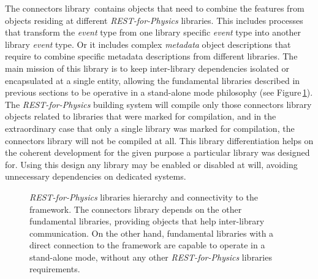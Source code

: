 The connectors library\,\cite{REST_Connectors_Git} contains objects that need to combine the features from objects residing at different \emph{REST-for-Physics} libraries. This includes processes that transform the \emph{event} type from one library specific \emph{event} type into another library \emph{event} type. Or it includes complex \emph{metadata} object descriptions that require to combine specific metadata descriptions from different libraries. The main mission of this library is to keep inter-library dependencies isolated or encapsulated at a single entity, allowing the fundamental libraries described in previous sections to be operative in a stand-alone mode philosophy (see Figure\,\ref{fig:connectorslib}). The \emph{REST-for-Physics} building system will compile only those connectors library objects related to libraries that were marked for compilation, and in the extraordinary case that only a single library was marked for compilation, the connectors library will not be compiled at all. This library differentiation helps on the coherent development for the given purpose a particular library was designed for. Using this design any library may be enabled or disabled at will, avoiding unnecessary dependencies on dedicated systems.

\begin{figure}[htb!]
  \centering
	\caption{\emph{REST-for-Physics} libraries hierarchy and connectivity to the framework. The connectors library depends on the other fundamental libraries, providing objects that help inter-library communication. On the other hand, fundamental libraries with a direct connection to the framework are capable to operate in a stand-alone mode, without any other \emph{REST-for-Physics} libraries requirements.}\label{fig:connectorslib}
\end{figure}

